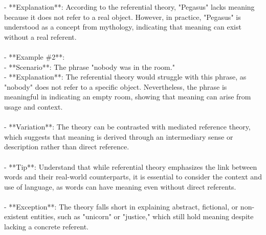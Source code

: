 \documentclass[a4paper,12pt,single,pdftex]{scrbook}
\begin{document}
    
        - **Explanation**: According to the referential theory, "Pegasus" lacks meaning because it does not refer to a real object. However, in practice, "Pegasus" is understood as a concept from mythology, indicating that meaning can exist without a real referent.
    \\

    
      
    \\

    
      - **Example \#2**:
    \\

    
        - **Scenario**: The phrase "nobody was in the room."
    \\

    
        - **Explanation**: The referential theory would struggle with this phrase, as "nobody" does not refer to a specific object. Nevertheless, the phrase is meaningful in indicating an empty room, showing that meaning can arise from usage and context.
    \\

    
      
    \\

    
      - **Variation**: The theory can be contrasted with mediated reference theory, which suggests that meaning is derived through an intermediary sense or description rather than direct reference.
    \\

    
      
    \\

    
      - **Tip**: Understand that while referential theory emphasizes the link between words and their real-world counterparts, it is essential to consider the context and use of language, as words can have meaning even without direct referents.
    \\

    
      
    \\

    
      - **Exception**: The theory falls short in explaining abstract, fictional, or non-existent entities, such as "unicorn" or "justice," which still hold meaning despite lacking a concrete referent.
    \\

    
      
    \\
\end{document}
